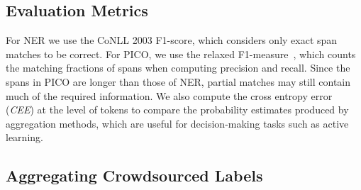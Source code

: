 \subsection{Evaluation Metrics}

For NER we use the CoNLL 2003 F1-score, which considers only exact span matches %
to be correct. 
For PICO, we use the relaxed F1-measure~\cite{nguyen2017aggregating}, which counts the matching fractions of spans when computing precision and recall.
Since the spans in PICO are longer than those of NER, partial matches may still contain much of the required information. 
We also compute the cross entropy error (\emph{CEE}) at the level of tokens
to compare the probability estimates produced by aggregation methods, which are useful for decision-making tasks such as active learning.

\subsection{Aggregating Crowdsourced Labels}\label{sec:task1}

